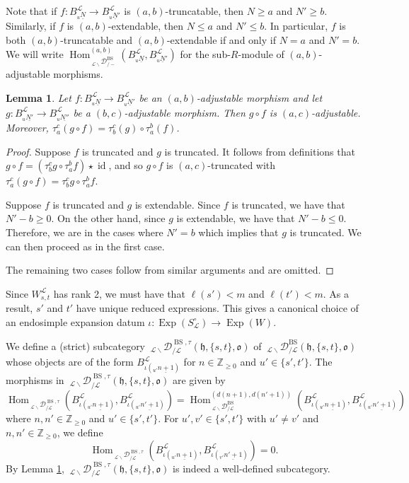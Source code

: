 \documentclass{amsart}
\newcommand{\Z}{\mathbb{Z}}
\newcommand{\scrL}{\mathcal{L}}
\DeclareMathOperator{\Hom}{Hom}
\DeclareMathOperator{\id}{id}
\newcommand{\fr}[1]{\mathfrak{#1}}
\DeclareMathOperator{\BS}{BS}
\newcommand{\EWmon}[2]{\:_{#1 \backslash} \mathcal{D}_{/ #2} }
\DeclareMathOperator{\Exp}{Exp}
\newtheorem{lemma}[subsubsection]{Lemma}
\theoremstyle{definition}
\numberwithin{equation}{subsection}
\begin{document}
Note that if $f : B_{{}_u \underline{N}}^{\scrL} \to B_{{}_u \underline{N}'}^{\scrL}$ is $(a,b)$-truncatable, then $N \geq a$ and $N' \geq b$.
Similarly, if $f$ is $(a,b)$-extendable, then $N \leq a$ and $N' \leq b$. In particular, $f$ is both $(a,b)$-truncatable and $(a,b)$-extendable if and only if $N = a$ and $N' = b$. 
We will write $\Hom_{\EWmon{\scrL}{-}^{\BS}}^{(a,b)} (B_{{}_u \underline{N}}^{\scrL}, B_{{}_u \underline{N}'}^{\scrL})$ for the sub-$R$-module of $(a,b)$-adjustable morphisms.
\begin{lemma}\label{lem:comp_of_ess_morphisms}
    Let $f : B_{{}_u \underline{N}}^{\scrL} \to B_{{}_u \underline{N}'}^{\scrL}$ be an $(a,b)$-adjustable morphism and let $g : B_{{}_u \underline{N'}}^{\scrL} \to B_{{}_u \underline{N''}}^{\scrL}$ be a $(b,c)$-adjustable morphism.
    Then $g\circ f$ is $(a,c)$-adjustable. Moreover, $\tau_a^c (g \circ f) =\tau_b^c (g) \circ \tau_a^b (f)$.
\end{lemma}
\begin{proof}
    Suppose $f$ is truncated and $g$ is truncated. It follows from definitions that $g \circ f  = (\tau_b^c g \circ \tau_a^b f) \star \id$, and so $g \circ f$ is $(a,c)$-truncated with $\tau_a^c (g \circ f) = \tau_b^c g \circ \tau_a^b f$.
    
    Suppose $f$ is truncated and $g$ is extendable.
    Since $f$ is truncated, we have that $N' - b \geq 0$. On the other hand, since $g$ is extendable, we have that $N' - b \leq 0$.
    Therefore, we are in the cases where $N' = b$ which implies that $g$ is truncated. We can then proceed as in the first case.
    
    The remaining two cases follow from similar arguments and are omitted.
\end{proof}

Since $W_{s,t}^{\scrL}$ has rank 2, we must have that $\ell (s') < m$ and $\ell (t') < m$.
As a result, $s'$ and $t'$ have unique reduced expressions. This gives a canonical choice of an endosimple expansion datum $\iota : \Exp (S_{\scrL}^{\circ}) \to \Exp (W)$.

We define a (strict) subcategory $\EWmon{\scrL}{\scrL}^{\BS, \tau} (\fr{h}, \{s,t\}, \fr{o})$ of $\EWmon{\scrL}{\scrL}^{\BS} (\fr{h}, \{s,t\}, \fr{o})$ whose objects are of the form $B_{\iota ({}_{u'} \underline{n+1})}^{\scrL}$ for $n \in \Z_{\geq 0}$ and $u' \in \{s',t'\}$.
The morphisms in $\EWmon{\scrL}{\scrL}^{\BS, \tau} (\fr{h}, \{s,t\}, \fr{o})$ are given by
\[\Hom_{\EWmon{\scrL}{\scrL}^{\BS, \tau}} (B_{\iota ({}_{u'} \underline{n+1})}^{\scrL}, B_{\iota ({}_{u'} \underline{n'+1})}^{\scrL} ) = \Hom_{\EWmon{\scrL}{\scrL}^{\BS}}^{(d(n+1), d(n'+1))} (B_{\iota ({}_{u'} \underline{n+1})}^{\scrL}, B_{\iota ({}_{u'} \underline{n'+1})}^{\scrL})\]
where $n,n' \in \Z_{\geq 0}$ and $u' \in \{s',t'\}$. For $u', v' \in \{s',t'\}$ with $u' \neq v'$ and $n,n' \in \Z_{\geq 0}$, we define
\[\Hom_{\EWmon{\scrL}{\scrL}^{\BS, \tau}} (B_{\iota ({}_{u'} \underline{n+1})}^{\scrL}, B_{\iota ({}_{v'} \underline{n'+1})}^{\scrL} ) = 0. \]
By Lemma \ref{lem:comp_of_ess_morphisms}, $\EWmon{\scrL}{\scrL}^{\BS, \tau} (\fr{h}, \{s,t\}, \fr{o})$ is indeed a well-defined subcategory.
\end{document}
